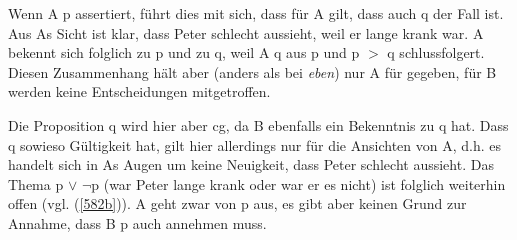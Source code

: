 Wenn A p assertiert, führt dies mit sich, dass für A gilt, dass auch q der Fall ist. Aus As Sicht ist klar, dass Peter schlecht aussieht, weil er lange krank war. A bekennt sich folglich zu p und zu q, weil A q aus p und p $>$ q schlussfolgert. Diesen Zusammenhang hält aber (anders als bei \textit{eben}) nur A für gegeben, für B werden keine Entscheidungen mitgetroffen. 

Die Proposition q wird hier aber cg, da B ebenfalls ein Bekenntnis zu q hat. Dass q sowieso Gültigkeit hat, gilt hier allerdings nur für die Ansichten von A, d.h. es handelt sich in As Augen um keine Neuigkeit, dass Peter schlecht aussieht. Das Thema p $\vee$ $\neg$p (war Peter lange krank oder war er es nicht) ist folglich weiterhin offen (vgl. (\ref{582b})). A geht zwar von p aus, es gibt aber keinen Grund zur Annahme, dass B p auch annehmen muss.

